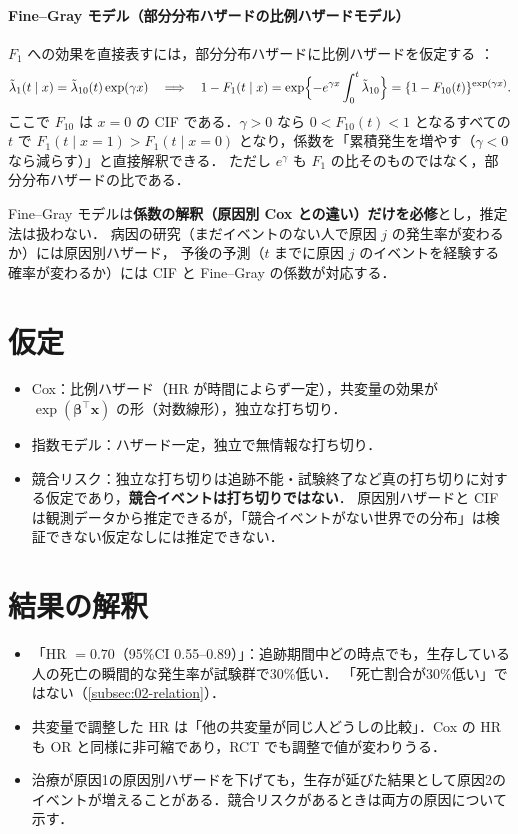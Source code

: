 \documentclass[a4paper,11pt,openany]{ltjsbook}
\newcommand{\transp}{^{\top}}
\begin{document}
\paragraph{Fine--Gray モデル（部分分布ハザードの比例ハザードモデル）}
$F_1$ への効果を直接表すには，部分分布ハザードに比例ハザードを仮定する \cite{finegray1999}：
\[
\tilde\lambda_1(t\mid x)=\tilde\lambda_{10}(t)\exp(\gamma x)
\quad\Longrightarrow\quad
1-F_1(t\mid x)=\exp\Bigl\{-e^{\gamma x}\int_0^t\tilde\lambda_{10}\Bigr\}=\{1-F_{10}(t)\}^{\exp(\gamma x)}.
\]
ここで $F_{10}$ は $x=0$ の CIF である．$\gamma>0$ なら $0<F_{10}(t)<1$ となるすべての $t$ で $F_1(t\mid x=1)>F_1(t\mid x=0)$ となり，係数を「累積発生を増やす（$\gamma<0$ なら減らす）」と直接解釈できる．
ただし $e^\gamma$ も $F_1$ の比そのものではなく，部分分布ハザードの比である．
\begin{pointbox}[本書での扱い]
Fine--Gray モデルは\textbf{係数の解釈（原因別 Cox との違い）だけを必修}とし，推定法は扱わない．
病因の研究（まだイベントのない人で原因 $j$ の発生率が変わるか）には原因別ハザード，
予後の予測（$t$ までに原因 $j$ のイベントを経験する確率が変わるか）には CIF と Fine--Gray の係数が対応する．
\end{pointbox}

\section{仮定}\label{sec:10-assump}
\begin{itemize}
\item Cox：比例ハザード（HR が時間によらず一定），共変量の効果が $\exp(\bm\beta\transp\bm x)$ の形（対数線形），独立な打ち切り．
\item 指数モデル：ハザード一定，独立で無情報な打ち切り．
\item 競合リスク：独立な打ち切りは追跡不能・試験終了など真の打ち切りに対する仮定であり，\textbf{競合イベントは打ち切りではない}．
      原因別ハザードと CIF は観測データから推定できるが，「競合イベントがない世界での分布」は検証できない仮定なしには推定できない．
\end{itemize}

\section{結果の解釈}\label{sec:10-interp}
\begin{itemize}
\item 「HR $=0.70$（95\%CI 0.55--0.89）」：追跡期間中どの時点でも，生存している人の死亡の瞬間的な発生率が試験群で30\%低い．
      「死亡割合が30\%低い」ではない（\cref{subsec:02-relation}）．
\item 共変量で調整した HR は「他の共変量が同じ人どうしの比較」．Cox の HR も OR と同様に非可縮であり，RCT でも調整で値が変わりうる．
\item 治療が原因1の原因別ハザードを下げても，生存が延びた結果として原因2のイベントが増えることがある．競合リスクがあるときは両方の原因について示す．
\end{itemize}
\end{document}
